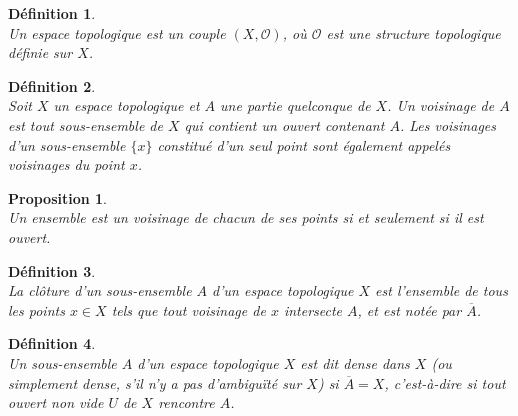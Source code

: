 \documentclass[a4paper, 14pt]{report}
\newtheorem{definition}{Définition}[section]
\newtheorem{proposition}{Proposition}[section]
\begin{document}
\begin{onehalfspace}
{\begin{definition} \cite{bourbaki2013general} \\
Un espace topologique est un couple \( (X, \mathcal{O}) \), où \( \mathcal{O} \) est une structure topologique définie sur \( X  \).
\end{definition}

\begin{definition}  \cite{bourbaki2013general} \\
Soit \( X \) un espace topologique et \( A \) une partie quelconque de \( X \). Un voisinage de \( A \) est tout sous-ensemble de \( X \) qui contient un ouvert contenant \( A \). Les voisinages d'un sous-ensemble \( \{ x \} \) constitué d'un seul point sont également appelés voisinages du point \( x \).
\end{definition}


\begin{proposition} \cite{bourbaki2013general} \\
Un ensemble est un voisinage de chacun de ses points si et seulement si il est ouvert.
\end{proposition}


\begin{definition} \cite{bourbaki2013general} \\
La clôture d'un sous-ensemble \( A \) d'un espace topologique \( X \) est l'ensemble de tous les points \( x \in X \) tels que tout voisinage de \( x \) intersecte \( A \), et est notée par \( \overline{A} \).
\end{definition}

\begin{definition}  \cite{bourbaki2013general} \\
Un sous-ensemble \( A \) d'un espace topologique \( X \) est dit dense dans \( X \) (ou simplement dense, s'il n'y a pas d'ambiguïté sur \( X \)) si \(\overline{A} = X\), c'est-à-dire si tout ouvert non vide \( U \) de \( X \) rencontre \( A \).
\end{definition}



}
\end{onehalfspace}
\end{document}
